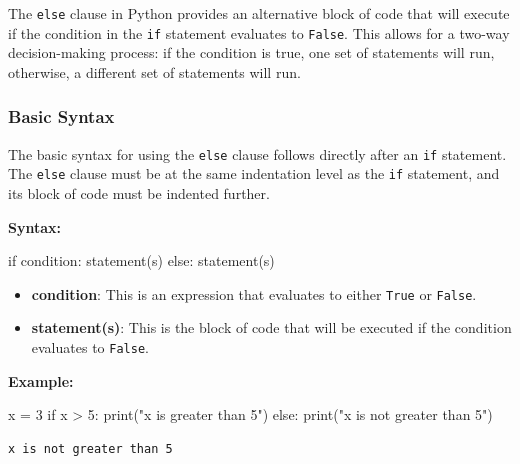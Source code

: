 \documentclass[
  letterpaper,
  DIV=11,
  numbers=noendperiod]{scrreprt}
\newenvironment{Shaded}{\begin{snugshade}}{\end{snugshade}}
\newcommand{\BuiltInTok}[1]{\textcolor[rgb]{0.00,0.23,0.31}{#1}}
\newcommand{\ControlFlowTok}[1]{\textcolor[rgb]{0.00,0.23,0.31}{#1}}
\newcommand{\DecValTok}[1]{\textcolor[rgb]{0.68,0.00,0.00}{#1}}
\newcommand{\NormalTok}[1]{\textcolor[rgb]{0.00,0.23,0.31}{#1}}
\newcommand{\OperatorTok}[1]{\textcolor[rgb]{0.37,0.37,0.37}{#1}}
\newcommand{\StringTok}[1]{\textcolor[rgb]{0.13,0.47,0.30}{#1}}
\providecommand{\tightlist}{%
  \setlength{\itemsep}{0pt}\setlength{\parskip}{0pt}}\usepackage{longtable,booktabs,array}
\begin{document}
The \texttt{else} clause in Python provides an alternative block of code
that will execute if the condition in the \texttt{if} statement
evaluates to \texttt{False}. This allows for a two-way decision-making
process: if the condition is true, one set of statements will run,
otherwise, a different set of statements will run.

\hypertarget{basic-syntax-1}{%
\subsubsection{Basic Syntax}\label{basic-syntax-1}}

The basic syntax for using the \texttt{else} clause follows directly
after an \texttt{if} statement. The \texttt{else} clause must be at the
same indentation level as the \texttt{if} statement, and its block of
code must be indented further.

\textbf{Syntax:}

\begin{Shaded}
\begin{Highlighting}[]
\ControlFlowTok{if}\NormalTok{ condition:}
\NormalTok{    statement(s)}
\ControlFlowTok{else}\NormalTok{:}
\NormalTok{    statement(s)}
\end{Highlighting}
\end{Shaded}

\begin{itemize}
\tightlist
\item
  \textbf{condition}: This is an expression that evaluates to either
  \texttt{True} or \texttt{False}.
\item
  \textbf{statement(s)}: This is the block of code that will be executed
  if the condition evaluates to \texttt{False}.
\end{itemize}

\textbf{Example:}

\begin{Shaded}
\begin{Highlighting}[]
\NormalTok{x }\OperatorTok{=} \DecValTok{3}
\ControlFlowTok{if}\NormalTok{ x }\OperatorTok{\textgreater{}} \DecValTok{5}\NormalTok{:}
    \BuiltInTok{print}\NormalTok{(}\StringTok{"x is greater than 5"}\NormalTok{)}
\ControlFlowTok{else}\NormalTok{:}
    \BuiltInTok{print}\NormalTok{(}\StringTok{"x is not greater than 5"}\NormalTok{)}
\end{Highlighting}
\end{Shaded}

\begin{verbatim}
x is not greater than 5
\end{verbatim}
\end{document}
